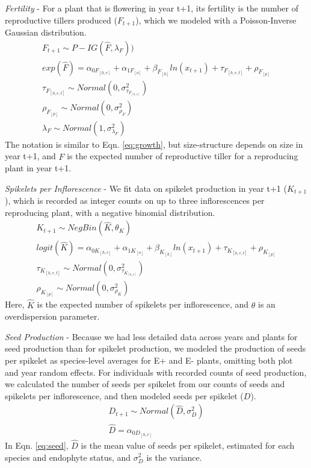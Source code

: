\documentclass[12pt]{article}
\begin{document}
\emph{Fertility} - For a plant that is flowering in year t+1, its fertility is the number of reproductive tillers produced ($F_{t+1}$), which we modeled with a Poisson-Inverse Gaussian distribution.
\begin{subequations} 
	\label{eq:fertility}
	\begin{align}
		F_{t+1} \sim P-IG(\hat{F},\lambda_{F})) \\
		exp(\hat{F}) =  \alpha_{0F_{[h,e]}} + \alpha_{1F_{[o]}} + \beta_{F_{[h]}}ln(x_{t+1}) + \tau_{F_{[h,e,t]}} + \rho_{F_{[p]}} \\
		\tau_{F_{[h,e,t]}} \sim Normal(0, \sigma^2_{\tau_{F_{[h,e]}}})\\
		\rho_{F_{[p]}} \sim Normal(0, \sigma^2_{\rho_{F}})\\
		\lambda_{F} \sim Normal(1,\sigma^2_{\lambda_{F}})
	\end{align}
\end{subequations}
The notation is similar to Eqn. \ref{eq:growth}, but size-structure depends on size in year t+1, and $\hat{F}$ is the expected number of reproductive tiller for a reproducing plant in year t+1.

\emph{Spikelets per Inflorescence} - We fit data on spikelet production in year t+1 ($K_{t+1}$), which is recorded as integer counts on up to three inflorescences per reproducing plant, with a negative binomial distribution. 
\begin{subequations} 
	\label{eq:spikelets}
	\begin{align}
		K_{t+1} \sim NegBin(\hat{K}, \theta_K) \\
		logit(\hat{K}) =  \alpha_{0K_{[h,e]}} + \alpha_{1K_{[o]}} + \beta_{K_{[h]}}ln(x_{t+1}) + \tau_{K_{[h,e,t]}} + \rho_{K_{[p]}} \\
		\tau_{K_{[h,e,t]}} \sim Normal(0, \sigma^2_{\tau_{K_{[h,e]}}})\\
		\rho_{K_{[p]}} \sim Normal(0, \sigma^2_{\rho_{K}})
	\end{align}
\end{subequations}
Here, $\hat{K}$ is the expected number of spikelets per inflorescence, and $\theta$ is an overdispersion parameter.

\emph{Seed Production} - Because we had less detailed data across years and plants for seed production than for spikelet production, we modeled the production of seeds per spikelet as species-level averages for E+ and E- plants, omitting both plot and year random effects. For individuals with recorded counts of seed production, we calculated the number of seeds per spikelet from our counts of seeds and spikelets per inflorescence, and then modeled seeds per spikelet ($D$).
\begin{subequations} 
	\label{eq:seed}
	\begin{align}
		D_{t+1} \sim Normal(\hat{D}, \sigma^2_{D}) \\
		\hat{D} =  \alpha_{0D_{[h,e]}} 
	\end{align}
\end{subequations}
In Eqn. \ref{eq:seed}, $\hat{D}$ is the mean value of seeds per spikelet, estimated for each species and endophyte status, and $\sigma^2_D$ is the variance.
\end{document}
